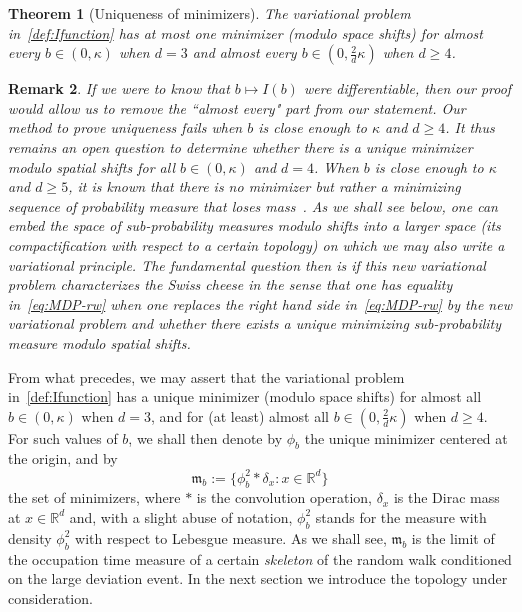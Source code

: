\documentclass[a4paper,11pt]{amsart}
\numberwithin{equation}{section}
\newtheorem{theorem}{Theorem}[section]
\newtheorem{remark}[theorem]{Remark}
\newcommand{\bbR}{{\ensuremath{\mathbb R}} }
\newcommand{\gd}{\delta}
\newcommand{\gk}{\kappa}
\newcommand{\8}{\infty}
\newcommand{\beq}{\begin{equation}}
\newcommand{\eeq}{\end{equation}}
\newcommand{\fm}{\mathfrak{m}}
\begin{document}
%
\begin{theorem}[Uniqueness of minimizers]
	\label{thm:1}
	The variational problem in~\eqref{def:Ifunction} has at most one minimizer (modulo space shifts) for almost every $b\in (0, \gk)$ when $d=3$ and almost every $b\in (0, \frac2 d \gk)$ when $d\ge 4$.
\end{theorem}
\begin{remark}
If we were to know that $b\mapsto I(b)$ were differentiable, then our proof would allow us to remove the ``almost every" part from our statement. Our method to prove uniqueness fails when $b$ is close enough to $\gk$ and $d\ge 4$. It thus remains an open question to determine whether there is a unique minimizer modulo spatial shifts for all $b\in(0,\gk)$ and $d=4$. When $b$ is close enough to $\gk$ and $d\ge 5$, it is known that there is no minimizer but rather a minimizing sequence of probability measure that loses mass~\cite[Theorem 5]{BBH2001}. As we shall see below, one can embed the space of sub-probability measures modulo shifts into a larger space (its compactification with respect to a certain topology) on which we may also write a variational principle. The fundamental question then is if this new variational problem characterizes the Swiss cheese in the sense that one has equality in~\eqref{eq:MDP-rw} when one replaces the right hand side in~\eqref{eq:MDP-rw} by the new variational problem and whether there exists a unique minimizing \emph{sub}-probability measure modulo spatial shifts. 
	\end{remark}
%
From what precedes, we may assert that the variational problem in~\eqref{def:Ifunction} has a unique minimizer (modulo space shifts) for almost all $b\in (0, \gk)$ when $d=3$, and for (at least) almost all $b\in(0,\tfrac2 d\gk)$ when $d\ge 4$. For such values of $b$, we shall then denote by $\phi_b$ the unique minimizer centered at the origin, and by
\beq
\fm_b := \{\phi_b^2 * \gd_x \colon x\in \bbR^d\}
\eeq
the set of minimizers, where $*$ is the convolution operation, $\gd_x$ is the Dirac mass at $x\in\bbR^d$ and, with a slight abuse of notation, $\phi_b^2$ stands for the measure with density $\phi_b^2$ with respect to Lebesgue measure. 
%
As we shall see, $\fm_b$ is the limit of the occupation time measure of a certain {\it skeleton} of the random walk conditioned on the large deviation event. In the next section we introduce the topology under consideration.
%
\end{document}
